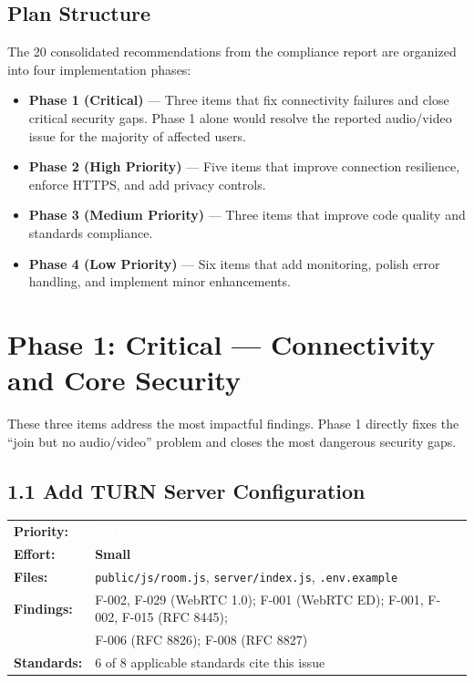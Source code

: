 \documentclass[11pt,letterpaper]{article}
\newcommand{\pricritical}{\colorbox{critical}{\textcolor{white}{\small\textbf{CRITICAL}}}}
\newcommand{\effsmall}{\colorbox{compliant!30}{\small\textbf{Small}}}
\begin{document}
\subsection{Plan Structure}

The 20 consolidated recommendations from the compliance report are organized into four implementation phases:

\begin{itemize}[leftmargin=2em]
    \item \textbf{Phase 1 (Critical)} --- Three items that fix connectivity failures and close critical security gaps. Phase 1 alone would resolve the reported audio/video issue for the majority of affected users.
    \item \textbf{Phase 2 (High Priority)} --- Five items that improve connection resilience, enforce HTTPS, and add privacy controls.
    \item \textbf{Phase 3 (Medium Priority)} --- Three items that improve code quality and standards compliance.
    \item \textbf{Phase 4 (Low Priority)} --- Six items that add monitoring, polish error handling, and implement minor enhancements.
\end{itemize}

\newpage

\section{Phase 1: Critical --- Connectivity and Core Security}

These three items address the most impactful findings. Phase 1 directly fixes the ``join but no audio/video'' problem and closes the most dangerous security gaps.

\subsection{1.1 Add TURN Server Configuration}

\begin{tabular}{ll}
\textbf{Priority:} & \pricritical \\
\textbf{Effort:} & \effsmall \\
\textbf{Files:} & \texttt{public/js/room.js}, \texttt{server/index.js}, \texttt{.env.example} \\
\textbf{Findings:} & F-002, F-029 (WebRTC 1.0); F-001 (WebRTC ED); F-001, F-002, F-015 (RFC 8445); \\
& F-006 (RFC 8826); F-008 (RFC 8827) \\
\textbf{Standards:} & 6 of 8 applicable standards cite this issue \\
\end{tabular}
\end{document}

